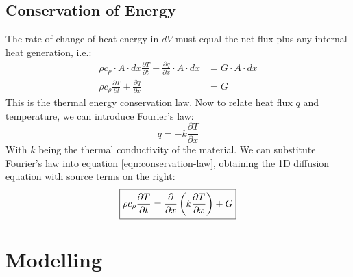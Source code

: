 \documentclass[12pt]{article}
\begin{document}
\subsection{Conservation of Energy}
The rate of change of heat energy in $dV$ must equal the net flux plus any internal heat generation, i.e.:
\begin{equation}
\begin{split}
    \rho c_\rho \cdot A \cdot  dx\frac{\partial T}{\partial t} + \frac{\partial q}{\partial x}\cdot A \cdot  dx &= G\cdot A \cdot  dx
    \\\rho c_\rho\frac{\partial T}{\partial t} + \frac{\partial q}{\partial x}&= G
\end{split}    
\label{eqn:conservation-law}
\end{equation}
This is the thermal energy conservation law. Now to relate heat flux $q$ and temperature, we can introduce Fourier's law:
\begin{equation}
    q = -k \frac{\partial T}{\partial x}
\end{equation}
With $k$ being the thermal conductivity of the material. We can substitute Fourier's law into equation \ref{eqn:conservation-law}, obtaining the 1D diffusion equation with source terms on the right:
\begin{equation}
    \boxed{\space \rho c_\rho\frac{\partial T}{\partial t} = \frac{\partial}{\partial x} \left(k \frac{\partial T}{\partial x}\right) + G \space}
\end{equation}
\section{Modelling}



\end{document}
